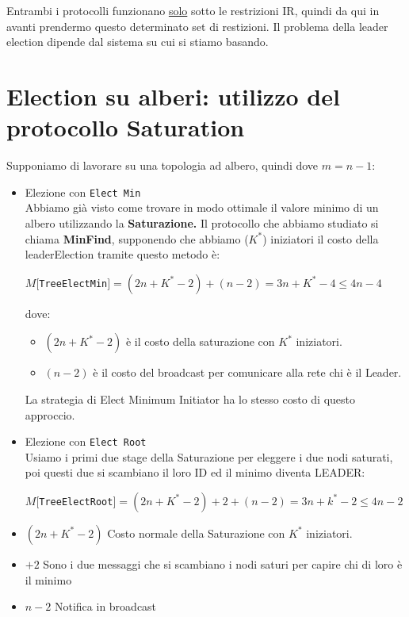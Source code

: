 Entrambi i protocolli funzionano \underline{solo} sotto le restrizioni IR, quindi da qui in avanti prendermo questo determinato set di restizioni. Il problema della leader election dipende dal sistema su cui si stiamo basando.

\section{Election su alberi: utilizzo del protocollo Saturation}
Supponiamo di lavorare su una topologia ad albero, quindi dove $m = n-1$:

\begin{itemize}
  \item Elezione con \texttt{Elect Min}\\
  Abbiamo già visto come trovare in modo ottimale il valore minimo di un albero utilizzando la \textbf{Saturazione.} Il protocollo che abbiamo studiato si chiama \textbf{MinFind}, supponendo che abbiamo ($K^*$) iniziatori il costo della leaderElection tramite questo metodo è:
  \begin{center}
    $M[$\texttt{TreeElectMin}$] = (2n + K^* -2) + (n-2) = 3n + K^* - 4 \leq 4n - 4$
  \end{center}
  dove: 
\begin{itemize}
    \item $(2n + K^* -2)$ è il costo della saturazione con $K^*$ iniziatori.
    \item $(n-2)$ è il costo del broadcast per comunicare alla rete chi è il Leader.
\end{itemize}
  
  La strategia di Elect Minimum Initiator ha lo stesso costo di questo approccio.
  \item Elezione con \texttt{Elect Root}\\
  Usiamo i primi due stage della Saturazione per eleggere i due nodi saturati, poi questi due si scambiano il loro ID ed il minimo diventa LEADER:
  \begin{center}
    $M[$\texttt{TreeElectRoot}$] = (2n + K^* -2) +2 + (n-2) = 3n + k^* - 2 \leq 4n - 2$
  \end{center}
\end{itemize}
\begin{itemize}
    \item $(2n + K^* -2)$ Costo normale della Saturazione con $K^*$ iniziatori.
    \item $+2$ Sono i due messaggi che si scambiano i nodi saturi per capire chi di loro è il minimo
    \item $n-2$ Notifica in broadcast
\end{itemize}


